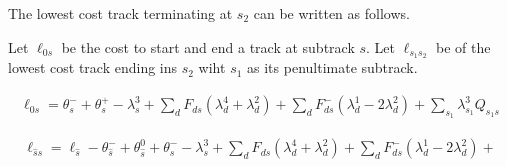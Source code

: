 \documentclass{article}
\begin{document}
The lowest cost track terminating at $s_2$ can be written as follows.  

Let $\ell_{0s}$ be the cost to start and end a track at subtrack $s$.  Let $\ell_{s_1s_2}$ be of the lowest cost track ending ins $s_2$ wiht $s_1$ as its penultimate subtrack.  

\begin{align}
\ell_{0s}=\theta^-_s+\theta^+_s-\lambda^3_s+\sum_{d}F_{ds}(\lambda^4_d+\lambda^2_d)+\sum_{d}F^-_{ds}(\lambda^1_d-2\lambda^2_d)+ \sum_{s_1} \lambda^3_{s_1}Q_{s_1s}
\end{align}

\begin{align}
\ell_{\hat{s}s}=\ell_{\hat{s}}-\theta^-_{\hat{s}}+\theta^0_{\hat{s}}+\theta^-_s-\lambda^3_s+\sum_{d}F_{ds}(\lambda^4_d+\lambda^2_d)+\sum_{d}F^-_{ds}(\lambda^1_d-2\lambda^2_d)+ %
\end{align}


\end{document}
